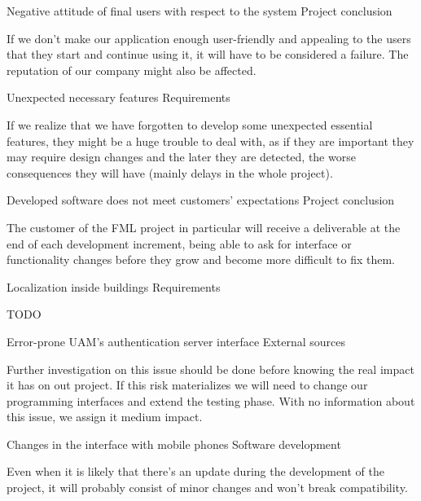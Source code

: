 \begin{risk}[riskAttitude]{Negative attitude of final users with respect to the system}
\riskcat Project conclusion

If we don't make our application enough user-friendly and appealing to the users that they start and continue using it, it will have to be considered a failure. The reputation of our company might also be affected.
\end{risk}

\begin{risk}[riskFeaturesUnexpected]{Unexpected necessary features}
\riskcat Requirements

If we realize that we have forgotten to develop some unexpected essential features, they might be a huge trouble to deal with, as if they are important they may require design changes and the later they are detected, the worse consequences they will have (mainly delays in the whole project).
\end{risk}

\begin{risk}[riskExpectations]{Developed software does not meet customers' expectations}
\riskcat Project conclusion

The customer of the FML project in particular will receive a deliverable at the end of each development increment, being able to ask for interface or functionality changes before they grow and become more difficult to fix them.
\end{risk}

\begin{risk}[riskLocalization]{Localization inside buildings}
\riskcat Requirements

TODO
\end{risk}

\begin{risk}[riskAuthServer]{Error-prone UAM's authentication server interface}
\riskcat External sources

Further investigation on this issue should be done before knowing the real impact it has on out project. If this risk materializes we will need to change our programming interfaces and extend the testing phase. With no information about this issue, we assign it medium impact.
\end{risk}

\begin{risk}[riskPhone]{Changes in the interface with mobile phones}
\riskcat Software development

Even when it is likely that there's an update during the development of the project, it will probably consist of minor changes and won't break compatibility.
\end{risk}


